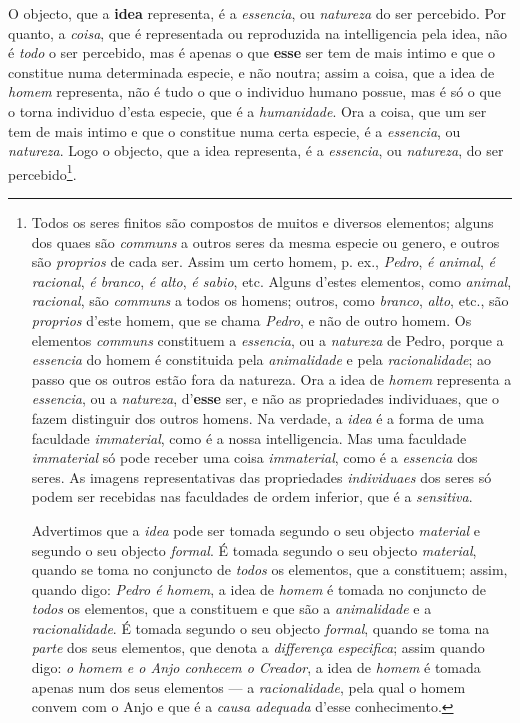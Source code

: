 
 
O objecto, que a \textbf{idea} representa, é a \emph{essencia}, ou \emph{natureza} do ser percebido. Por quanto, a \emph{coisa}, que é representada ou reproduzida na intelligencia pela idea, não é \emph{todo} o ser percebido, mas é apenas o que \textbf{esse} ser tem de mais intimo e que o constitue numa determinada especie, e não noutra; assim a coisa, que a idea de \emph{homem} representa, não é tudo o que o individuo humano possue, mas é só o que o torna individuo d'esta especie, que é a \emph{humanidade}. Ora a coisa, que um ser tem de mais intimo e que o constitue numa certa especie, é a \emph{essencia}, ou \emph{natureza}. Logo o objecto, que a idea representa, é a \emph{essencia}, ou \emph{natureza}, do ser percebido\footnote{Todos os seres finitos são compostos de muitos e diversos elementos; alguns dos quaes são \emph{communs} a outros seres da mesma especie ou genero, e outros são \emph{proprios} de cada ser. Assim um certo homem, p. ex., \emph{Pedro}, \emph{é animal}, \emph{é racional}, \emph{é branco}, \emph{é alto}, \emph{é sabio}, etc. Alguns d'estes elementos, como \emph{animal}, \emph{racional}, são \emph{communs} a todos os homens; outros, como \emph{branco}, \emph{alto}, etc., são \emph{proprios} d'este homem, que se chama \emph{Pedro}, e não de outro homem. Os elementos \emph{communs} constituem a \emph{essencia}, ou a \emph{natureza} de Pedro, porque a \emph{essencia} do homem é constituida pela \emph{animalidade} e pela \emph{racionalidade}; ao passo que os outros estão fora da natureza. Ora a idea de \emph{homem} representa a \emph{essencia}, ou a \emph{natureza}, d'\textbf{esse} ser, e não as propriedades individuaes, que o fazem distinguir dos outros homens. Na verdade, a \emph{idea} é a forma de uma faculdade \emph{immaterial}, como é a nossa intelligencia. Mas uma faculdade \emph{immaterial} só pode receber uma coisa \emph{immaterial}, como é a \emph{essencia} dos seres. As imagens representativas das propriedades \emph{individuaes} dos seres só podem ser recebidas nas faculdades de ordem inferior, que é a \emph{sensitiva}.\par Advertimos que a \emph{idea} pode ser tomada segundo o seu objecto \emph{material} e segundo o seu objecto \emph{formal}. É tomada segundo o seu objecto \emph{material}, quando se toma no conjuncto de \emph{todos} os elementos, que a constituem; assim, quando digo: \emph{Pedro é homem}, a idea de \emph{homem} é tomada no conjuncto de \emph{todos} os elementos, que a constituem e que são a \emph{animalidade} e a \emph{racionalidade}. É tomada segundo o seu objecto \emph{formal}, quando se toma na \emph{parte} dos seus elementos, que denota a \emph{differença especifica}; assim quando digo: \emph{o homem e o Anjo conhecem o Creador}, a idea de \emph{homem} é tomada apenas num dos seus elementos --- a \emph{racionalidade}, pela qual o homem convem com o Anjo e que é a \emph{causa adequada} d'esse conhecimento.}.

